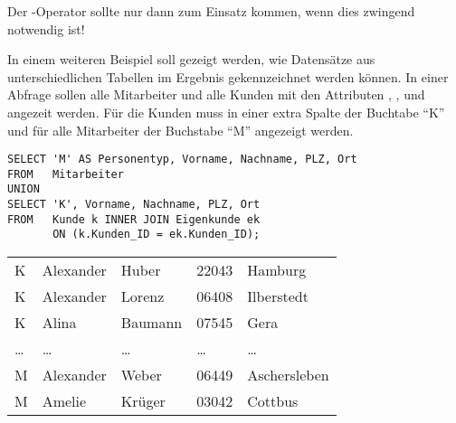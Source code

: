 \begin{merke}
    Der -Operator sollte nur dann zum Einsatz kommen, wenn dies zwingend notwendig ist!
\end{merke}
In einem weiteren Beispiel soll gezeigt werden, wie Datensätze aus unterschiedlichen Tabellen im Ergebnis gekennzeichnet werden können. In einer Abfrage sollen alle Mitarbeiter und alle Kunden mit den Attributen , ,  und  angezeit werden. Für die Kunden muss in einer extra Spalte der Buchtabe \enquote{K} und für alle Mitarbeiter der Buchstabe \enquote{M} angezeigt werden.
\begin{lstlisting}[language=oracle_sql,caption={Spalten mit konstanten Werten und UNION},label=sql04_24]
SELECT 'M' AS Personentyp, Vorname, Nachname, PLZ, Ort
FROM   Mitarbeiter
UNION
SELECT 'K', Vorname, Nachname, PLZ, Ort
FROM   Kunde k INNER JOIN Eigenkunde ek
       ON (k.Kunden_ID = ek.Kunden_ID);
          \end{lstlisting}
\begin{center}
    \begin{small}
        \tablehead{}
        \begin{msoraclesql}
            \begin{supertabular}{lllll}
                K & Alexander & Huber & 22043 & Hamburg \\
                K & Alexander & Lorenz & 06408 & Ilberstedt \\
                K & Alina & Baumann & 07545 & Gera \\
                \dots & \dots & \dots & \dots & \dots \\
                M & Alexander & Weber & 06449 & Aschersleben \\
                M & Amelie & Krüger & 03042 & Cottbus \\
            \end{supertabular}
        \end{msoraclesql}
    \end{small}
\end{center}
